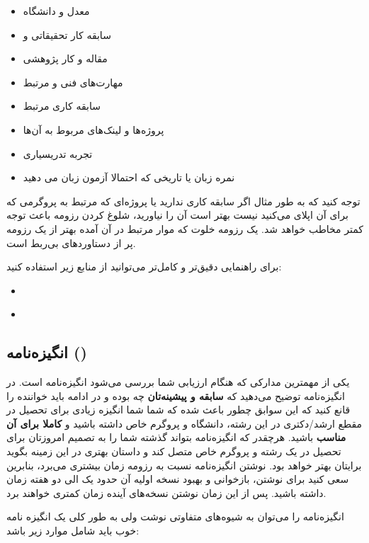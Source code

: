 \begin{itemize}[leftmargin=1.5cm]
  \item معدل و دانشگاه
  \item سابقه کار تحقیقاتی و 
  \item مقاله و کار پژوهشی
  \item مهارت‌های فنی و مرتبط
  \item سابقه کاری مرتبط
  \item پروژه‌ها و لینک‌های مربوط به آن‌ها
  \item تجربه تدریسیاری
  \item نمره زبان یا تاریخی که احتمالا آزمون زبان می دهید
\end{itemize}
توجه کنید که به طور مثال اگر سابقه کاری ندارید یا پروژه‌ای که مرتبط به پروگرمی که برای آن اپلای می‌کنید نیست بهتر است آن را نیاورید،
شلوغ کردن رزومه باعث توجه کمتر مخاطب خواهد شد. یک رزومه خلوت که موار مرتبط در آن آمده بهتر از یک رزومه پر از دستاورد‌های بی‌ربط است. 

برای راهنمایی دقیق‌تر و کامل‌تر می‌توانید از منابع زیر استفاده کنید:

\begin{itemize}[leftmargin=1.5cm]
\item \href{https://github.com/shaily99/advice#cv}{}
\item \href{https://www.youtube.com/playlist?list=PL3rXObcfMsILRH6bypjHRs5XS6ANLc2oI}{}
\end{itemize}


\subsection{انگیزه‌نامه ()}\label{ssec:sop}
یکی از مهمترین مدارکی که هنگام ارزیابی شما بررسی می‌شود انگیزه‌نامه است. در انگیزه‌نامه توضیح می‌دهید که \textbf{سابقه و پیشینه‌تان} چه بوده و 
در ادامه باید خواننده را قانع کنید که این سوابق چطور باعث شده که شما شما انگیزه زیادی برای تحصیل در مقطع ارشد/دکتری در این 
رشته، دانشگاه و پروگرم خاص داشته باشید و \textbf{کاملا برای آن مناسب} باشید. هرچقدر که انگیزه‌نامه بتواند گذشته ‌شما را به تصمیم امروزتان برای 
تحصیل در یک رشته و پروگرم خاص متصل کند و داستان بهتری در این زمینه بگوید برایتان بهتر خواهد بود. نوشتن انگیزه‌نامه نسبت به رزومه زمان بیشتری می‌برد،
بنابرین سعی کنید برای نوشتن، بازخوانی و بهبود نسخه اولیه آن حدود یک الی دو هفته زمان داشته باشید. پس از این زمان نوشتن نسخه‌های آینده 
زمان کمتری خواهند برد. 

انگیزه‌نامه را می‌توان به شیوه‌های متفاوتی نوشت ولی به طور کلی یک انگیزه نامه خوب باید شامل موارد زیر باشد:

